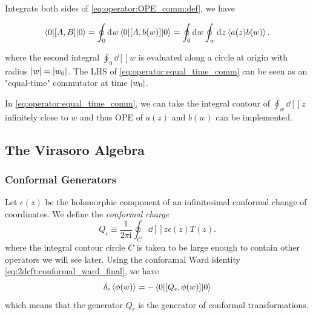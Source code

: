 \documentclass[10pt]{article}
\newcommand{\ii}{\mathrm{i}}
\newenvironment{boxmath}[1]{\begin{tcolorbox}[enhanced,attach boxed title to top center={yshift=-\tcboxedtitleheight/2},boxrule=1pt,title={\centering #1},colframe=NavyBlue!70!black,colback=NavyBlue!10,colbacktitle=NavyBlue!10,fonttitle=\scshape,coltitle=Black]}{\end{tcolorbox}}
\begin{document}
Integrate both sides of \cref{eq:operator:OPE_comm:def}, we have
\begin{boxmath}{Equal-time Commutator}
    \begin{align}
        \ev**{\comm{A}{B}}{0}=\oint_0\dd[]{w}\ev**{\comm{A}{b(w)}}{0}=\oint_0\dd[]{w}\oint_w\dd[]{z}\expval{a(z)b(w)}.\label{eq:operator:equal_time_comm}
    \end{align}
\end{boxmath}
where the second integral $\oint_0\dd[]{w}$ is evaluated along a circle at origin with radius $\abs{w}=\abs{w_0}$.
The LHS of \cref{eq:operator:equal_time_comm} can be seen as an "equal-time" commutator at time $\abs{w_0}$.
\begin{remark}
    In \cref{eq:operator:equal_time_comm}, we can take the integral contour of $\oint_w\dd[]{z}$ infinitely close to $w$ and thus OPE of $a(z)$ and $b(w)$ can be implemented.
\end{remark}


\subsection{The Virasoro Algebra}
\subsubsection{Conformal Generators}
Let $\epsilon(z)$ be the holomorphic component of an infinitesimal conformal change of coordinates.
We define the \textit{conformal charge}
\begin{equation}
    Q_\epsilon\equiv\frac{1}{2\pi\ii}\oint_C\dd[]{z}\epsilon(z)T(z).\label{eq:operator:def:Q_epsilon}
\end{equation}
where the integral contour circle $C$ is taken to be large enough to contain other operators we will see later.
Using the conforamal Ward identity \cref{eq:2dcft:conformal_ward_final}, we have
\begin{equation}
    \delta_\epsilon\expval{\phi(w)}=-\ev**{\comm{Q_\epsilon}{\phi(w)}}{0}
\end{equation}
which means that the generator $Q_\epsilon$ is the generator of conformal transformations.
\end{document}
